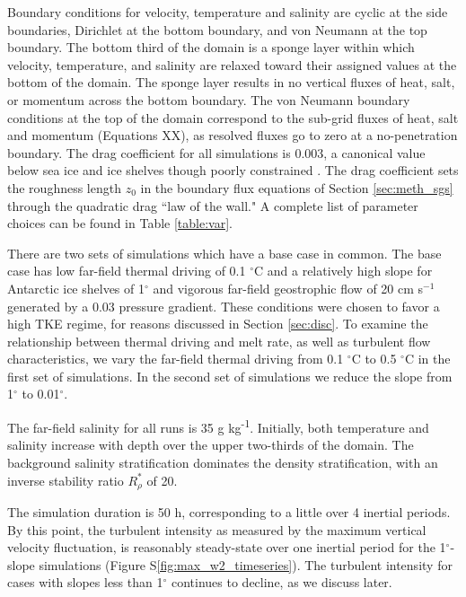 \documentclass[draft]{styles/agujournal2019}
\begin{document}
Boundary conditions for velocity, temperature and salinity are cyclic at the side boundaries, Dirichlet at the bottom boundary, and von Neumann at the top boundary. The bottom third of the domain is a sponge layer within which velocity, temperature, and salinity are relaxed toward their assigned values at the bottom of the domain. The sponge layer results in no vertical fluxes of heat, salt, or momentum across the bottom boundary. The von Neumann boundary conditions at the top of the domain correspond to the sub-grid fluxes of heat, salt and momentum (Equations XX), as resolved fluxes go to zero at a no-penetration boundary. The drag coefficient for all simulations is 0.003, a canonical value below sea ice and ice shelves though poorly constrained \cite{XX}. The drag coefficient sets the roughness length $z_0$ in the boundary flux equations of Section \ref{sec:meth_sgs} through the quadratic drag ``law of the wall." A complete list of parameter choices can be found in Table \ref{table:var}.

There are two sets of simulations which have a base case in common. The base case has low far-field thermal driving of 0.1 $^{\circ}$C and a relatively high slope for Antarctic ice shelves of 1$^{\circ}$ and vigorous far-field geostrophic flow of 20 cm s$^{-1}$ generated by a 0.03 pressure gradient. These conditions were chosen to favor a high TKE regime, for reasons discussed in Section \ref{sec:disc}. To examine the relationship between thermal driving and melt rate, as well as turbulent flow characteristics, we vary the far-field thermal driving from 0.1 $^{\circ}$C to 0.5 $^{\circ}$C in the first set of simulations. In the second set of simulations we reduce the slope from 1$^{\circ}$ to 0.01$^{\circ}$. 

The far-field salinity for all runs is 35 g kg\textsuperscript{-1}. Initially, both temperature and salinity increase with depth over the upper two-thirds of the domain. The background salinity stratification dominates the density stratification, with an inverse stability ratio $R_\rho^*$ of 20. 

The simulation duration is 50 h, corresponding to a little over 4 inertial periods. By this point, the turbulent intensity as measured by the maximum vertical velocity fluctuation, is reasonably steady-state over one inertial period for the 1$^{\circ}$-slope simulations (Figure S\ref{fig:max_w2_timeseries}). The turbulent intensity for cases with slopes less than 1$^{\circ}$ continues to decline, as we discuss later.
\end{document}
